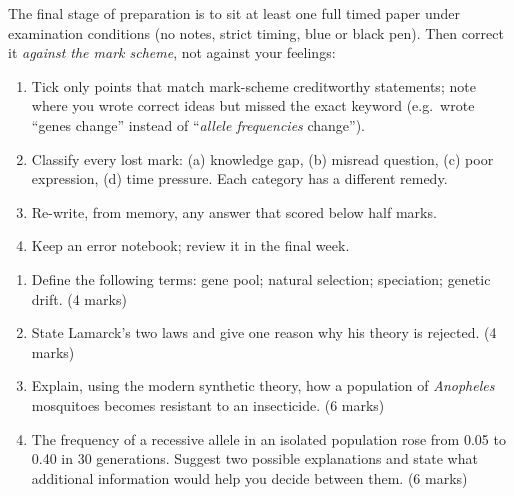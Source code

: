 \documentclass[11pt]{article}
\begin{document}
The final stage of preparation is to sit at least one full timed paper under examination conditions (no notes, strict timing, blue or black pen). Then correct it \emph{against the mark scheme}, not against your feelings:

\begin{enumerate}
\item Tick only points that match mark-scheme creditworthy statements; note where you wrote correct ideas but missed the exact keyword (e.g.\ wrote ``genes change'' instead of ``\emph{allele frequencies} change'').
\item Classify every lost mark: (a) knowledge gap, (b) misread question, (c) poor expression, (d) time pressure. Each category has a different remedy.
\item Re-write, from memory, any answer that scored below half marks.
\item Keep an error notebook; review it in the final week.
\end{enumerate}

\begin{exercice}
\begin{enumerate}
\item Define the following terms: gene pool; natural selection; speciation; genetic drift. (4 marks)
\item State Lamarck's two laws and give one reason why his theory is rejected. (4 marks)
\item Explain, using the modern synthetic theory, how a population of \emph{Anopheles} mosquitoes becomes resistant to an insecticide. (6 marks)
\item The frequency of a recessive allele in an isolated population rose from 0.05 to 0.40 in 30 generations. Suggest two possible explanations and state what additional information would help you decide between them. (6 marks)
\end{enumerate}
\end{exercice}
\end{document}
